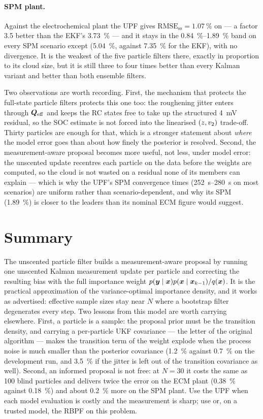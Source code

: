 \paragraph{SPM plant.}  Against the electrochemical plant the UPF gives
$\mathrm{RMSE}_{\mathrm{ss}} = \SI{1.07}{\percent}$ on  --- a factor \num{3.5} better
than the EKF's \SI{3.73}{\percent} --- and it stays in the \SIrange{0.84}{1.89}{\percent} band on
every SPM scenario except  (\SI{5.04}{\percent}, against \SI{7.35}{\percent} for the
EKF), with no divergence.  It is the weakest of the five particle filters there, exactly in
proportion to its cloud size, but it is still three to four times better than every Kalman variant
and better than both ensemble filters.

Two observations are worth recording.  First, the mechanism that protects the full-state particle
filters protects this one too: the roughening jitter enters through $\bm{Q}_{\mathrm{eff}}$ and keeps
the RC states free to take up the structured \SI{4}{\milli\volt} residual, so the SOC estimate is
not forced into the linearised $(z,v_2)$ trade-off.  Thirty particles are enough for that, which
is a stronger statement about \emph{where} the model error goes than about how finely the posterior
is resolved.  Second, the measurement-aware proposal becomes more useful, not less, under model
error: the unscented update recentres each particle on the data before the weights are computed, so
the cloud is not wasted on a residual none of its members can explain --- which is why the UPF's SPM
convergence times (\SIrange{252}{280}{\second} on most scenarios) are uniform rather than
scenario-dependent, and why its SPM  (\SI{1.89}{\percent}) is closer to the
leaders than its nominal ECM figure would suggest.

\section{Summary}
The unscented particle filter builds a measurement-aware proposal by running one unscented Kalman
measurement update per particle and correcting the resulting bias with the full importance weight
$p(\bm{y}\mid\bm{x})p(\bm{x}\mid\bm{x}_{k-1})/q(\bm{x})$.  It is the practical approximation of the
variance-optimal importance density, and it works as advertised: effective sample sizes stay near
$N$ where a bootstrap filter degenerates every step.  Two lessons from this model are worth
carrying elsewhere.  First, a particle is a sample: the proposal prior must be the transition
density, and carrying a per-particle UKF covariance --- the letter of the original algorithm ---
makes the transition term of the weight explode when the process noise is much smaller than the
posterior covariance (\SI{1.2}{\percent} against \SI{0.7}{\percent} on the development run, and
\SI{3.5}{\percent} if the jitter is left out of the transition covariance as well).  Second, an
informed proposal is not free: at $N=30$ it costs the same as 100 blind particles and delivers
twice the error on the ECM plant (\SI{0.38}{\percent} against \SI{0.18}{\percent}) and about
\SI{0.2}{\percent} more on the SPM plant.  Use the UPF when each model evaluation is costly and the
measurement is sharp; use  or, on a trusted model, the RBPF on this problem.

